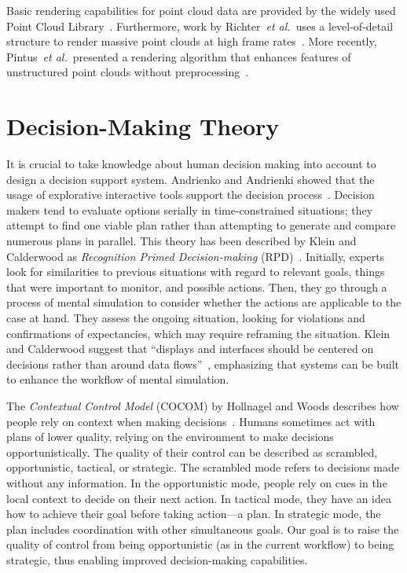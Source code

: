 \documentclass{egpubl}
\def\etal{\textit{et al.}}
\begin{document}
 Basic rendering capabilities for point cloud data are provided by the widely used Point Cloud Library~\cite{Rusu11ICRA}. Furthermore, work by Richter~\etal\ uses a level-of-detail structure to render massive point clouds at high frame rates~\cite{Richter:2010:ORV:1811158.1811178}. More recently, Pintus~\etal\ presented a rendering algorithm that enhances features of unstructured point clouds without preprocessing~\cite{Pintus:2011:RRM:2384495.2384513}.


\section{Decision-Making Theory} \label{sec:theory}
It is crucial to take knowledge about human decision making into account to design a decision support system. Andrienko and Andrienki showed that the usage of explorative interactive tools support the decision process~\cite{Andrienko:2003kv}. Decision makers tend to evaluate options serially in time-constrained situations; they attempt to find one viable plan rather than attempting to generate and compare numerous plans in parallel. This theory has been described by Klein and Calderwood as \emph{Recognition Primed Decision-making} (RPD)~\cite{KleinCalderwood}. Initially, experts look for similarities to previous situations with regard to relevant goals, things that were important to monitor, and possible actions. Then, they go through a process of mental simulation to consider whether the actions are applicable to the case at hand. They assess the ongoing situation, looking for violations and confirmations of expectancies, which may require reframing the situation. Klein and Calderwood suggest that ``displays and interfaces should be centered on decisions rather than around data flows''~\cite{KleinCalderwood}, emphasizing that systems can be built to enhance the workflow of mental simulation. 

The \emph{Contextual Control Model} (COCOM) by Hollnagel and Woods describes how people rely on context when making decisions~\cite{hollnagel2005joint}. Humans sometimes act with plans of lower quality, relying on the environment to make decisions opportunistically. The quality of their control can be described as scrambled, opportunistic, tactical, or strategic. The scrambled mode refers to decisions made without any information. In the opportunistic mode, people rely on cues in the local context to decide on their next action. In tactical mode, they have an idea how to achieve their goal before taking action---a plan. In strategic mode, the plan includes coordination with other simultaneous goals. Our goal is to raise the quality of control from being opportunistic (as in the current workflow) to being strategic, thus enabling improved decision-making capabilities.
\end{document}
